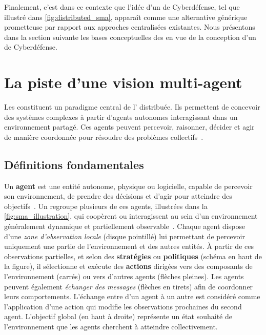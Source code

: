 \noindent
Finalement, c'est dans ce contexte que l'idée d'un  de Cyberdéfense, tel que illustré dans \autoref{fig:distributed_sma}, apparaît comme une alternative générique prometteuse par rapport aux approches centralisées existantes. Nous présentons dans la section suivante les bases conceptuelles des  en vue de la conception d'un  de Cyberdéfense.

\section{La piste d'une vision multi-agent}\label{sec:sma-concepts}

Les  constituent un paradigme central de l' distribuée. Ils permettent de concevoir des systèmes complexes à partir d'agents autonomes interagissant dans un environnement partagé. Ces agents peuvent percevoir, raisonner, décider et agir de manière coordonnée pour résoudre des problèmes collectifs~\cite{Ferber1999,Wooldridge2002}.

\subsection*{Définitions fondamentales}

Un \textbf{agent} est une entité autonome, physique ou logicielle, capable de percevoir son environnement, de prendre des décisions et d'agir pour atteindre des objectifs~\cite{Russell2010}. Un  regroupe plusieurs de ces agents, illustrées dans la \autoref{fig:sma_illustration}, qui coopèrent ou interagissent au sein d'un environnement généralement dynamique et partiellement observable~\cite{Jennings1998,Shoham2007}. Chaque agent dispose d'une \emph{zone d'observation locale} (disque pointillé) lui permettant de percevoir uniquement une partie de l'environnement et des autres entités. À partir de ces observations partielles, et selon des \textbf{stratégies} ou \textbf{politiques} (schéma en haut de la figure), il sélectionne et exécute des \textbf{actions} dirigées vers des composants de l'environnement (carrés) ou vers d'autres agents (flèches pleines). Les agents peuvent également \emph{échanger des messages} (flèches en tirets) afin de coordonner leurs comportements. L'échange entre d'un agent à un autre est considéré comme l'application d'une action qui modifie les observations prochaines du second agent. L'objectif global (en haut à droite) représente un état souhaité de l'environnement que les agents cherchent à atteindre collectivement.

